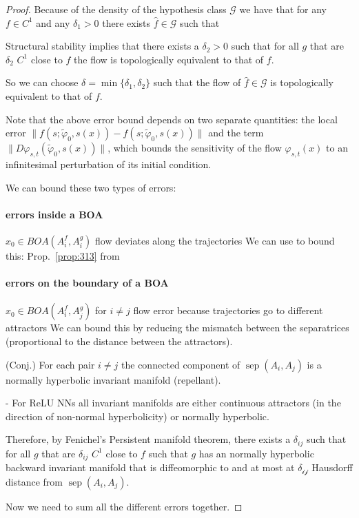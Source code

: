 \documentclass{article}
\theoremstyle{definition}
\theoremstyle{remark}
\newcommand{\sep}{\operatorname{sep}}
\begin{document}
\begin{proof}
Because of the density of the hypothesis class $\mathcal{G}$ we have that for any $f\in C^1$ and any $\delta_1>0$
there exists $\hat f\in\mathcal{G}$ such that 


Structural stability implies that there exists a $\delta_2>0$ such that for all $g$ that are $\delta_2$ $C^1$ close to $f$ the flow is topologically equivalent to that of $f$.

So we can choose $\delta = \min\{\delta_1,\delta_2\}$ such that the flow of $\hat f\in\mathcal{G}$ is topologically equivalent to that of $f$.


Note that the above error bound depends on two separate quantities: the local error 
$\| f(s; \tilde{\varphi}_0, s(x)) - f(s; \tilde{\varphi}_0, s(x)) \|$ 
 and the term 
$\| D\varphi_{s,t}(\tilde{\varphi}_0, s(x)) \|$, 
which bounds the sensitivity of the flow $\varphi_{s,t}(x)$ to an infinitesimal perturbation of its initial condition.


We can bound these two types of errors:
\paragraph{errors inside a BOA}
$x_0\in BOA(A_i^f,A_i^g)$ flow deviates along the trajectories
We can use \citep{vanhandel2007filtering} to bound this:
Prop.~\ref{prop:313} from \citep{vanhandel2007filtering}





\paragraph{errors on the boundary of a BOA}
$x_0\in BOA(A_i^f,A_j^g)$ for $i\neq j$
flow error because trajectories go to different attractors
We can bound this by reducing the mismatch between the separatrices (proportional to the distance between the attractors).

(Conj.) For each pair $i\neq j$ the connected component of $\sep(A_i,A_j)$ is a normally hyperbolic invariant manifold (repellant).

- For ReLU NNs all invariant manifolds are either continuous attractors (in the direction of non-normal hyperbolicity) or normally hyperbolic.

Therefore, by Fenichel's Persistent manifold theorem, there exists a $\delta_{ij}$ such that for all $g$ that are $\delta_{ij}$ $C^1$ close to $f$ such that $g$ has an  normally hyperbolic backward invariant manifold that is diffeomorphic to and at most at $\mathcal{\delta_{ij}}$ Hausdorff distance from $\sep(A_i,A_j)$.





Now we need to sum all the different errors together.
\end{proof}
\end{document}
